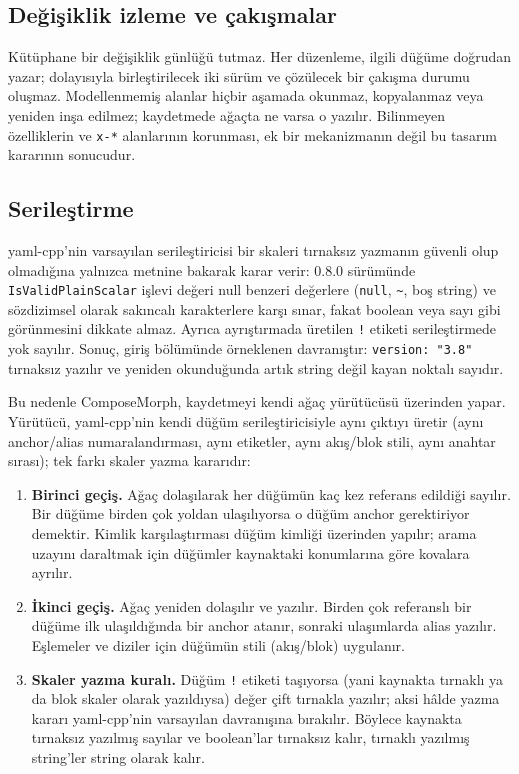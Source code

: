 \documentclass[12pt,a4paper]{article}
\begin{document}
\subsection{Değişiklik izleme ve çakışmalar}
Kütüphane bir değişiklik günlüğü tutmaz. Her düzenleme, ilgili düğüme
doğrudan yazar; dolayısıyla birleştirilecek iki sürüm ve çözülecek bir
çakışma durumu oluşmaz. Modellenmemiş alanlar hiçbir aşamada okunmaz,
kopyalanmaz veya yeniden inşa edilmez; kaydetmede ağaçta ne varsa o
yazılır. Bilinmeyen özelliklerin ve \texttt{x-*} alanlarının korunması,
ek bir mekanizmanın değil bu tasarım kararının sonucudur.

\subsection{Serileştirme}
yaml-cpp'nin varsayılan serileştiricisi bir skaleri tırnaksız yazmanın
güvenli olup olmadığına yalnızca metnine bakarak karar verir: 0.8.0
sürümünde \texttt{IsValidPlainScalar} işlevi değeri null benzeri
değerlere (\texttt{null}, \texttt{\textasciitilde}, boş string) ve
sözdizimsel olarak sakıncalı karakterlere karşı sınar, fakat boolean veya
sayı gibi görünmesini dikkate almaz. Ayrıca ayrıştırmada üretilen
\texttt{!} etiketi serileştirmede yok sayılır. Sonuç, giriş bölümünde
örneklenen davranıştır:
\texttt{version: "3.8"} tırnaksız yazılır ve yeniden okunduğunda artık
string değil kayan noktalı sayıdır.

Bu nedenle ComposeMorph, kaydetmeyi kendi ağaç yürütücüsü üzerinden yapar.
Yürütücü, yaml-cpp'nin kendi düğüm serileştiricisiyle aynı çıktıyı üretir
(aynı anchor/alias numaralandırması, aynı etiketler, aynı akış/blok stili,
aynı anahtar sırası); tek farkı skaler yazma kararıdır:

\begin{enumerate}
  \item \textbf{Birinci geçiş.} Ağaç dolaşılarak her düğümün kaç kez
    referans edildiği sayılır. Bir düğüme birden çok yoldan ulaşılıyorsa o
    düğüm anchor gerektiriyor demektir. Kimlik karşılaştırması düğüm
    kimliği üzerinden yapılır; arama uzayını daraltmak için düğümler
    kaynaktaki konumlarına göre kovalara ayrılır.
  \item \textbf{İkinci geçiş.} Ağaç yeniden dolaşılır ve yazılır. Birden
    çok referanslı bir düğüme ilk ulaşıldığında bir anchor atanır, sonraki
    ulaşımlarda alias yazılır. Eşlemeler ve diziler için düğümün stili
    (akış/blok) uygulanır.
  \item \textbf{Skaler yazma kuralı.} Düğüm \texttt{!} etiketi taşıyorsa
    (yani kaynakta tırnaklı ya da blok skaler olarak yazıldıysa) değer çift
    tırnakla yazılır; aksi
    hâlde yazma kararı yaml-cpp'nin varsayılan davranışına bırakılır.
    Böylece kaynakta tırnaksız yazılmış sayılar ve boolean'lar tırnaksız
    kalır, tırnaklı yazılmış string'ler string olarak kalır.
\end{enumerate}
\end{document}
